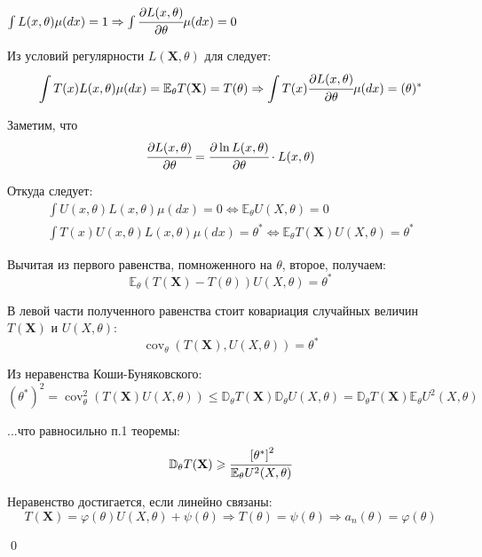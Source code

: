 \documentclass[oneside,final,14pt]{extreport}
\renewenvironment{proof}{{\bfseries Доказательство.}}{\qed}
\theoremstyle{plain}
\theoremstyle{definition}
\theoremstyle{named}
\begin{document}
\begin{proof}
$\int L(x, \theta) \mu(d x)=1 \Rightarrow \int \cfrac{\partial L(x, \theta)}{\partial \theta} \mu(d x)=0$

Из условий регулярности $L(\mathbf{X}, \theta)$ для следует:
\begin{equation*}
    \int T(x) L(x, \theta) \mu(d x)=\mathbb{E}_{\theta} T(\mathbf{X})=T(\theta) \Rightarrow \int T(x) \cfrac{\partial L(x, \theta)}{\partial \theta} \mu(d x)=(\theta)^{*}
\end{equation*}

Заметим, что
\begin{equation*}
    \cfrac{\partial L(x, \theta)}{\partial \theta}=\cfrac{\partial \ln L(x, \theta)}{\partial \theta} \cdot L(x, \theta)
\end{equation*}

Откуда следует:
\begin{gather*}
    \int U(x, \theta) L(x, \theta) \mu(d x)=0 \Leftrightarrow \mathbb{E}_{\theta} U(X, \theta)=0 \\
\int T(x) U(x, \theta) L(x, \theta) \mu(d x)=\theta^{*} \Leftrightarrow \mathbb{E}_{\theta} T(\mathbf{X}) U(X, \theta)=\theta^{*}
\end{gather*}

Вычитая из первого равенства, помноженного на $\theta$, второе, получаем:
\begin{equation*}
    \mathbb{E}_{\theta}(T(\mathbf{X})-T(\theta)) U(X, \theta)=\theta^{*}
\end{equation*}

В левой части полученного равенства стоит ковариация случайных величин $T(\mathbf{X})$ и $U(X,\theta)$:
\begin{equation*}
    \operatorname{cov}_{\theta}(T(\mathbf{X}), U(X, \theta))=\theta^{*}
\end{equation*}

Из неравенства Коши-Буняковского:
\begin{equation*}
    \left(\theta^{*}\right)^{2}=\operatorname{cov}_{\theta}^{2}(T(\mathbf{X}) U(X, \theta)) \leqslant \mathbb{D}_{\theta} T(\mathbf{X}) \mathbb{D}_{\theta} U(X, \theta)=\mathbb{D}_{\theta} T(\mathbf{X}) \mathbb{E}_{\theta} U^{2}(X, \theta)
\end{equation*}

...что равносильно п.1 теоремы:
\begin{equation*}
    \mathbb{D}_{\theta} T(\mathbf{X}) \geqslant \cfrac{\left[\theta^{*}\right]^{2}}{\mathbb{E}_{\theta} U^{2}(X, \theta)}
\end{equation*}

Неравенство достигается, если линейно связаны:
\begin{equation*}
    T(\mathbf{X})=\varphi(\theta) U(X, \theta)+\psi(\theta) \Rightarrow T(\theta)=\psi(\theta) \Rightarrow a_{n}(\theta)=\varphi(\theta)
\end{equation*}

\end{proof}
\end{document}
